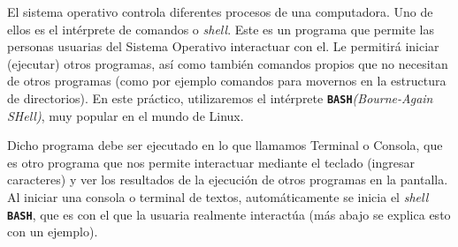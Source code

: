 \documentclass[12pt]{article}
\newcommand{\bash}{\textbf{\texttt{BASH}}}
\begin{document}
El sistema operativo controla diferentes procesos de una computadora. Uno de
ellos es el intérprete de comandos o \emph{shell}. Este es un programa que
permite las personas usuarias del Sistema Operativo interactuar con el.  Le
permitirá iniciar (ejecutar) otros programas, así como también comandos
propios que no necesitan de otros programas (como por ejemplo comandos para
movernos en la estructura de directorios). En este práctico, utilizaremos el
intérprete \bash\emph{(Bourne-Again SHell)}, muy popular en el mundo de Linux.

Dicho programa debe ser ejecutado en lo que llamamos Terminal o Consola, que
es otro programa que nos permite interactuar mediante el teclado (ingresar
caracteres) y ver los resultados de la ejecución de otros programas en la
pantalla. Al iniciar una consola o terminal de textos, automáticamente se
inicia el \emph{shell} \bash, que es con el que la usuaria realmente
interactúa (más abajo se explica esto con un ejemplo).
\end{document}
